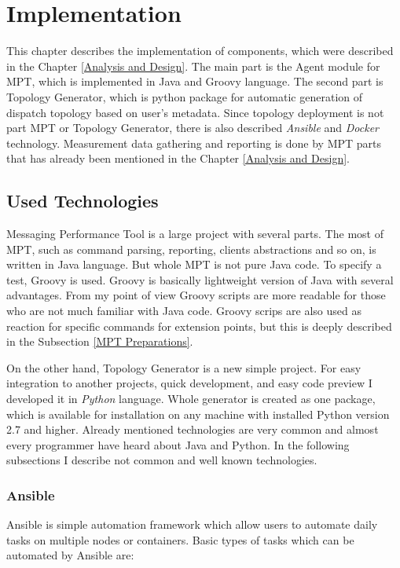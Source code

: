 \chapter{Implementation}
\label{Implementation}
This chapter describes the implementation of components, which were described in the Chapter \ref{Analysis and Design}. The main part is the Agent module for MPT, which is implemented in Java and Groovy language. The second part is Topology Generator, which is python package for automatic generation of dispatch topology based on user's metadata. Since topology deployment is not part MPT or Topology Generator, there is also described \emph{Ansible} and \emph{Docker} technology. Measurement data gathering and reporting is done by MPT parts that has already been mentioned in the Chapter \ref{Analysis and Design}.


\section{Used Technologies}
Messaging Performance Tool is a large project with several parts. The most of MPT, such as command parsing, reporting, clients abstractions and so on, is written in Java language. But whole MPT is not pure Java code. To specify a test, Groovy is used. Groovy is basically lightweight version of Java with several advantages. From my point of view Groovy scripts are more readable for those who are not much familiar with Java code. Groovy scrips are also used as reaction for specific commands for extension points, but this is deeply described in the Subsection \ref{MPT Preparations}.

On the other hand, Topology Generator is a new simple project. For easy integration to another projects, quick development, and easy code preview I developed it in \emph{Python} language. Whole generator is created as one package, which is available for installation on any machine with installed Python version 2.7 and higher. Already mentioned technologies are very common and almost every programmer have heard about Java and Python. In the following subsections I describe not common and well known technologies.

\subsection{Ansible}
Ansible \cite{Ansible} is simple automation framework which allow users to automate daily tasks on multiple nodes or containers. Basic types of tasks which can be automated by Ansible are:

